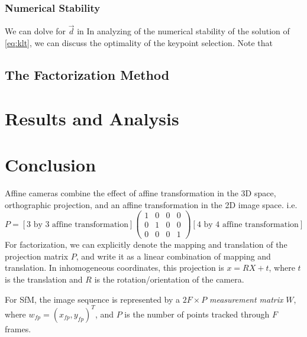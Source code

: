 \subsubsection{Numerical Stability}
\label{sec:numerical-stability}
We can dolve for $\vec d$ in 
 In analyzing of the numerical stability of the solution of
 \eqref{eq:klt}, we can discuss the optimality of the keypoint
 selection. Note that 


\subsection{The Factorization Method}

\section{Results and Analysis}
\label{sec:results}


\section{Conclusion}
\label{sec:conclusion}


Affine cameras combine the effect of affine transformation in the 3D
space, orthographic projection, and an affine transformation in the 2D
image space. i.e. $$P=[\text{3 by 3 affine transformation}]\begin{pmatrix}
  1&0 & 0& 0 \\0 & 1& 0 & 0 \\ 0 & 0 & 0 & 1
\end{pmatrix}[\text{4 by 4 affine transformation}] $$ For factorization, we can explicitly denote the mapping
and translation of the projection matrix $P$, and write it
as a linear combination of mapping and translation. In
inhomogeneous coordinates, this projection is $x =RX + t$, where $t$
is the translation and $R$ is the rotation/orientation of the camera.

For SfM, the image sequence is represented by a $2F\times P$ \emph{measurement matrix
}$W$, where $w_{fp} = (x_{fp}, y_{fp})^T$, and
$P$ is the number of points tracked through $F$
frames.  

